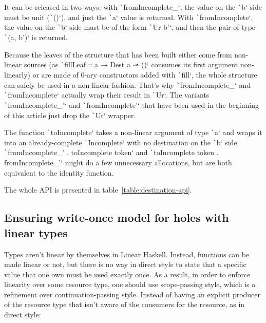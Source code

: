 \documentclass[english]{jflart}
\begin{document}
It can be released in two ways: with \texttt`fromIncomplete_`, the value on the \texttt`b` side must be unit (\texttt`()`), and just the \texttt`a` value is returned. With \texttt`fromIncomplete`, the value on the \texttt`b` side must be of the form  \texttt`Ur b'`, and then the pair of type \texttt`(a, b')` is returned.

Because the leaves of the structure that has been built either come from non-linear sources (as \texttt`fillLeaf :: a → Dest a ⊸ ()` consumes its first argument non-linearly) or are made of 0-ary constructors added with \texttt`fill`, the whole structure can safely be used in a non-linear fashion. That's why \texttt`fromIncomplete_` and \texttt`fromIncomplete` actually wrap their result in \texttt`Ur`. The variants \texttt`fromIncomplete_'` and \texttt`fromIncomplete'` that have been used in the beginning of this article just drop the \texttt`Ur` wrapper.

The function \texttt`toIncomplete` takes a non-linear argument of type \texttt`a` and wraps it into an already-complete \texttt`Incomplete` with no destination on the \texttt`b` side. \texttt`fromIncomplete_' . toIncomplete token` and \texttt`toIncomplete token . fromIncomplete_'` might do a few unnecessary allocations, but are both equivalent to the identity function.

The whole API is presented in table~\ref{table:destination-api}.

\subsection{Ensuring write-once model for holes with linear types}\label{ssec:api-linearity}

Types aren't linear by themselves in Linear Haskell. Instead, functions can be made linear or not, but there is no way in direct style to state that a specific value that one own must be used exactly once. As a result, in order to enforce linearity over some resource type, one should use scope-passing style, which is a refinement over continuation-passing style. Instead of having an explicit producer of the resource type that isn't aware of the consumers for the resource, as in direct style:
\end{document}
